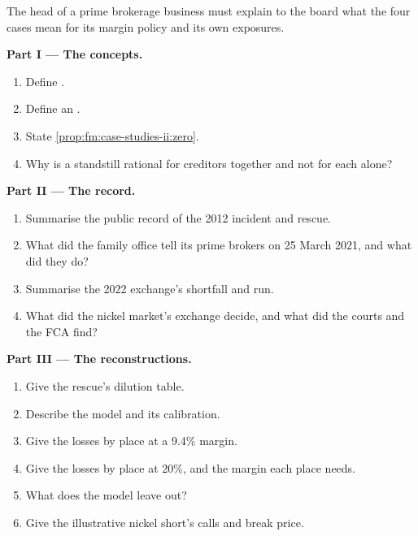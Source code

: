 \begin{problem}\label{pb:fm:case-studies-ii:1}
The head of a prime brokerage business must explain to the board what the four cases mean for its margin policy and its own exposures.

\medskip\noindent\textbf{Part I --- The concepts.}
\begin{enumerate}
\item Define .
\item Define an .
\item State \cref{prop:fm:case-studies-ii:zero}.
\item Why is a standstill rational for creditors together and not for each alone?
\end{enumerate}

\medskip\noindent\textbf{Part II --- The record.}
\begin{enumerate}[resume]
\item Summarise the public record of the 2012 incident and rescue.
\item What did the family office tell its prime brokers on 25 March 2021, and what did they do?
\item Summarise the 2022 exchange's shortfall and run.
\item What did the nickel market's exchange decide, and what did the courts and the FCA find?
\end{enumerate}

\medskip\noindent\textbf{Part III --- The reconstructions.}
\begin{enumerate}[resume]
\item Give the rescue's dilution table.
\item Describe the  model and its calibration.
\item Give the losses by place at a 9.4\% margin.
\item Give the losses by place at 20\%, and the margin each place needs.
\item What does the model leave out?
\item Give the illustrative nickel short's calls and break price.
\end{enumerate}


\end{problem}

